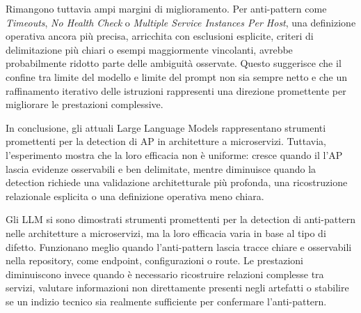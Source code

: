 Rimangono tuttavia ampi margini di miglioramento. Per anti-pattern come \textit{Timeouts}, \textit{No Health Check} o \textit{Multiple Service Instances Per Host}, una definizione operativa ancora più precisa, arricchita con esclusioni esplicite, criteri di delimitazione più chiari o esempi maggiormente vincolanti, avrebbe probabilmente ridotto parte delle ambiguità osservate. Questo suggerisce che il confine tra limite del modello e limite del prompt non sia sempre netto e che un raffinamento iterativo delle istruzioni rappresenti una direzione promettente per migliorare le prestazioni complessive.

In conclusione, gli attuali Large Language Models rappresentano strumenti promettenti per la detection di AP in architetture a microservizi. Tuttavia, l’esperimento mostra che la loro efficacia non è uniforme: cresce quando il l'AP lascia evidenze osservabili e ben delimitate, mentre diminuisce quando la detection richiede una validazione architetturale più profonda, una ricostruzione relazionale esplicita o una definizione operativa meno chiara.

\begin{tcolorbox}[
    title=\textbf{Sintesi della risposta alla RQ1},
    colback=blue!3!white,
    colframe=blue!55!black,
    coltitle=white,
    fonttitle=\bfseries,
    enhanced,
    breakable,
    arc=2mm,
    boxrule=0.8pt
]
Gli LLM si sono dimostrati strumenti promettenti per la detection di anti-pattern nelle architetture a microservizi, ma la loro efficacia varia in base al tipo di difetto. Funzionano meglio quando l’anti-pattern lascia tracce chiare e osservabili nella repository, come endpoint, configurazioni o route. Le prestazioni diminuiscono invece quando è necessario ricostruire relazioni complesse tra servizi, valutare informazioni non direttamente presenti negli artefatti o stabilire se un indizio tecnico sia realmente sufficiente per confermare l’anti-pattern.
\end{tcolorbox}

